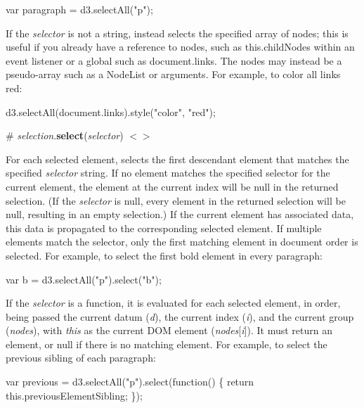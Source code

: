 \begin{DoxyCode}
var paragraph = d3.selectAll("p");
\end{DoxyCode}


If the {\itshape selector} is not a string, instead selects the specified array of nodes; this is useful if you already have a reference to nodes, such as {\ttfamily this.\+child\+Nodes} within an event listener or a global such as {\ttfamily document.\+links}. The nodes may instead be a pseudo-\/array such as a {\ttfamily Node\+List} or {\ttfamily arguments}. For example, to color all links red\+:


\begin{DoxyCode}
d3.selectAll(document.links).style("color", "red");
\end{DoxyCode}


\label{_selection_select}%
\# {\itshape selection}.{\bfseries select}({\itshape selector}) \href{https://github.com/d3/d3-selection/blob/master/src/selection/select.js}{\tt $<$$>$}

For each selected element, selects the first descendant element that matches the specified {\itshape selector} string. If no element matches the specified selector for the current element, the element at the current index will be null in the returned selection. (If the {\itshape selector} is null, every element in the returned selection will be null, resulting in an empty selection.) If the current element has associated data, this data is propagated to the corresponding selected element. If multiple elements match the selector, only the first matching element in document order is selected. For example, to select the first bold element in every paragraph\+:


\begin{DoxyCode}
var b = d3.selectAll("p").select("b");
\end{DoxyCode}


If the {\itshape selector} is a function, it is evaluated for each selected element, in order, being passed the current datum ({\itshape d}), the current index ({\itshape i}), and the current group ({\itshape nodes}), with {\itshape this} as the current D\+OM element ({\itshape nodes}\mbox{[}{\itshape i}\mbox{]}). It must return an element, or null if there is no matching element. For example, to select the previous sibling of each paragraph\+:


\begin{DoxyCode}
var previous = d3.selectAll("p").select(function() \{
  return this.previousElementSibling;
\});
\end{DoxyCode}


